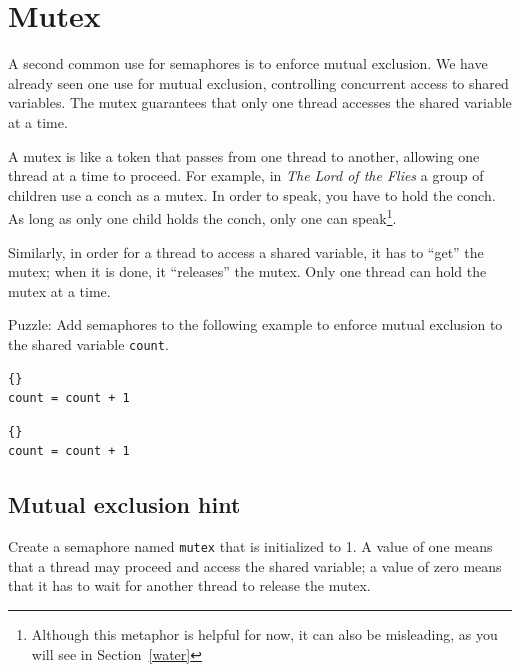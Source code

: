 \documentclass{book}
\newcommand{\clearemptydoublepage}{\newpage\cleardoublepage}
\begin{document}
\section{Mutex}

A second common use for semaphores is to enforce mutual exclusion.
We have already seen one use for mutual exclusion, controlling
concurrent access to shared variables.  The mutex guarantees
that only one thread accesses the shared variable at a time.

A mutex is like a token that passes from one thread to another,
allowing one thread at a time to proceed.  For example, in {\em The
Lord of the Flies} a group of children use a conch as a mutex.  In
order to speak, you have to hold the conch.  As long as only one child
holds the conch, only one can speak\footnote{Although this metaphor
is helpful for now, it can also be misleading, as you will see in
Section~\ref{water}}.

Similarly, in order for a thread to access a shared variable,
it has to ``get'' the mutex; when it is done, it ``releases''
the mutex.  Only one thread can hold the mutex at a time.

Puzzle: Add semaphores to the following example to
enforce mutual exclusion to the shared variable {\tt count}.

\begin{latin}
\begin{minipage}[t]{2in}
\begin{latin}
\begin{lstlisting}[title=\rl{نخ \lr{A}}]{}
count = count + 1
\end{lstlisting}
\end{latin}
\end{minipage}
\hfill
\begin{minipage}[t]{2in}
\begin{latin}
\begin{lstlisting}[title=\rl{نخ \lr{B}}]{}
count = count + 1
\end{lstlisting}
\end{latin}
\end{minipage}
\end{latin}

\clearemptydoublepage
\subsection{Mutual exclusion hint}

Create a semaphore named {\tt mutex} that is initialized
to 1.  A value of one means that a thread may proceed and
access the shared variable; a value of zero means that it
has to wait for another thread to release the mutex.
\end{document}
